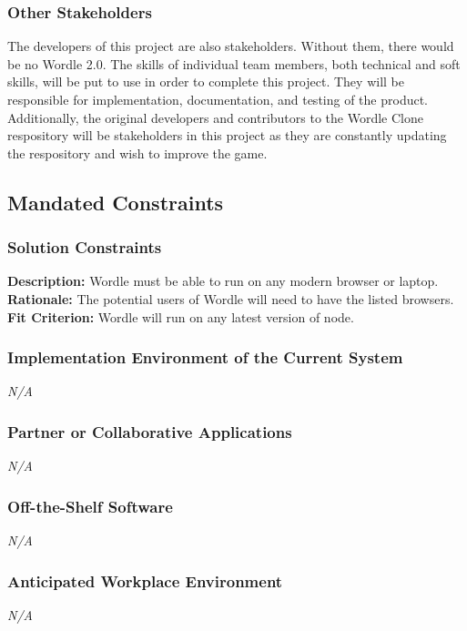 \documentclass[12pt, titlepage]{article}
\begin{document}
\subsubsection{Other Stakeholders}
The developers of this project are also stakeholders. Without them, there would 
be no Wordle 2.0. The skills of individual team members, both technical and 
soft skills, will be put to use in order to complete this project. They will be 
responsible for implementation, documentation, and testing of the product. 
Additionally, the original developers and contributors to the Wordle Clone 
respository will be stakeholders in this project as they are constantly 
updating the respository and wish to improve the game.

\subsection{Mandated Constraints}
\subsubsection{Solution Constraints}
\noindent \textbf{Description:} Wordle must be able to run on any modern browser or laptop.\\
\textbf{Rationale:} The potential users of Wordle will need to have the listed browsers. \\
\textbf{Fit Criterion:} Wordle will run on any latest version of node.

\subsubsection{Implementation Environment of the Current System}
\noindent \emph{N/A}

\subsubsection{Partner or Collaborative Applications}
\noindent \emph{N/A}

\subsubsection{Off-the-Shelf Software}
\noindent \emph{N/A}

\subsubsection{Anticipated Workplace Environment}
\noindent \emph{N/A}
\end{document}

